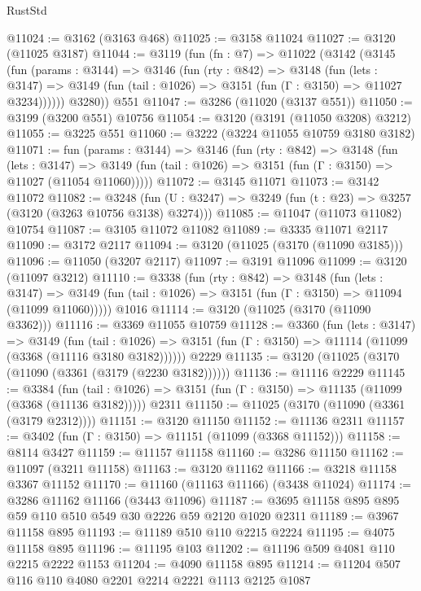 \begin{lexlean}{RustStd}
\begin{coremodule}
{\begin{coremodule}
{{{{{{{{{{{{{{{{{{{{{{{{{{@11024 := @3162 (@3163 @468)
@11025 := @3158 @11024
@11027 := @3120 (@11025 @3187)
@11044 := @3119
    (fun (fn : @7) =>
    @11022
      (@3142
        (@3145
          (fun (params : @3144) =>
          @3146
            (fun (rty : @842) =>
            @3148
              (fun (lets : @3147) =>
              @3149 (fun (tail : @1026) => @3151 (fun (Γ : @3150) => @11027 @3234))))))
        @3280))
    @551
@11047 := @3286 (@11020 (@3137 @551))
@11050 := @3199 (@3200 @551) @10756
@11054 := @3120 (@3191 (@11050 @3208) @3212)
@11055 := @3225 @551
@11060 := @3222 (@3224 @11055 @10759 @3180 @3182)
@11071 := fun (params : @3144) =>
  @3146
    (fun (rty : @842) =>
    @3148
      (fun (lets : @3147) =>
      @3149 (fun (tail : @1026) => @3151 (fun (Γ : @3150) => @11027 (@11054 @11060)))))
@11072 := @3145 @11071
@11073 := @3142 @11072
@11082 := @3248
    (fun (U : @3247) => @3249 (fun (t : @23) => @3257 (@3120 (@3263 @10756 @3138) @3274)))
@11085 := @11047 (@11073 @11082) @10754
@11087 := @3105 @11072 @11082
@11089 := @3335 @11071 @2117
@11090 := @3172 @2117
@11094 := @3120 (@11025 (@3170 (@11090 @3185)))
@11096 := @11050 (@3207 @2117)
@11097 := @3191 @11096
@11099 := @3120 (@11097 @3212)
@11110 := @3338
    (fun (rty : @842) =>
    @3148
      (fun (lets : @3147) =>
      @3149 (fun (tail : @1026) => @3151 (fun (Γ : @3150) => @11094 (@11099 @11060)))))
    @1016
@11114 := @3120 (@11025 (@3170 (@11090 @3362)))
@11116 := @3369 @11055 @10759
@11128 := @3360
    (fun (lets : @3147) =>
    @3149
      (fun (tail : @1026) =>
      @3151 (fun (Γ : @3150) => @11114 (@11099 (@3368 (@11116 @3180 @3182))))))
    @2229
@11135 := @3120 (@11025 (@3170 (@11090 (@3361 (@3179 (@2230 @3182))))))
@11136 := @11116 @2229
@11145 := @3384
    (fun (tail : @1026) => @3151 (fun (Γ : @3150) => @11135 (@11099 (@3368 (@11136 @3182)))))
    @2311
@11150 := @11025 (@3170 (@11090 (@3361 (@3179 @2312))))
@11151 := @3120 @11150
@11152 := @11136 @2311
@11157 := @3402 (fun (Γ : @3150) => @11151 (@11099 (@3368 @11152)))
@11158 := @8114 @3427
@11159 := @11157 @11158
@11160 := @3286 @11150
@11162 := @11097 (@3211 @11158)
@11163 := @3120 @11162
@11166 := @3218 @11158 @3367 @11152
@11170 := @11160 (@11163 @11166) (@3438 @11024)
@11174 := @3286 @11162 @11166 (@3443 @11096)
@11187 := @3695 @11158 @895 @895 @59 @110 @510 @549 @30 @2226 @59 @2120 @1020 @2311
@11189 := @3967 @11158 @895
@11193 := @11189 @510 @110 @2215 @2224
@11195 := @4075 @11158 @895
@11196 := @11195 @103
@11202 := @11196 @509 @4081 @110 @2215 @2222 @1153
@11204 := @4090 @11158 @895
@11214 := @11204 @507 @116 @110 @4080 @2201 @2214 @2221 @1113 @2125 @1087
}}}}}}}}}}}}}}}}}}}}}}}}}}
\end{coremodule}}
\end{coremodule}
\end{lexlean}

